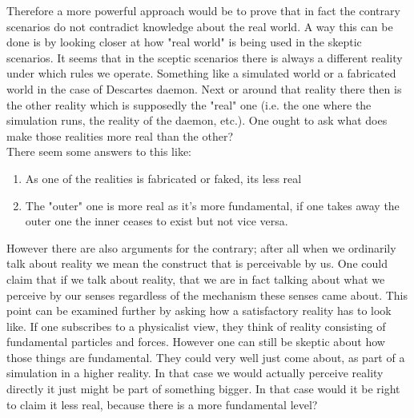 \documentclass[14pt]{article}
\begin{document}
Therefore a more powerful approach would be to prove that in fact the contrary scenarios do not contradict knowledge about the real world.
A way this can be done is by looking closer at how "real world" is being used in the skeptic scenarios. It seems that in the sceptic scenarios
there is always a different reality under which rules we operate. Something like a simulated world or a fabricated world in the case of Descartes
daemon. Next or around that reality there then is the other reality which is supposedly the "real" one (i.e. the one where the simulation runs, the
reality of the daemon, etc.). One ought to ask what does make those realities more real than the other? \\

There seem some answers to this like:
\begin{enumerate}
  \item As one of the realities is fabricated or faked, its less real
  \item The "outer" one is more real as it's more fundamental, if one takes away the outer one the inner ceases to exist but not vice versa. 
\end{enumerate}

However there are also arguments for the contrary; after all when we ordinarily talk about reality we mean the construct that is perceivable by us.
One could claim that  if we talk about reality, that we are in fact talking about what we perceive by our senses regardless
of the mechanism these senses came about. This point can be examined further by asking how a satisfactory reality has to look like. If one subscribes
to a physicalist view, they think of reality consisting of fundamental particles and forces. However one can still be skeptic about how those things
are fundamental. They could very well just come about, as part of a simulation in a higher reality. In that case we would actually perceive reality
directly it just might be part of something bigger. In that case would it be right to claim it less real, because there is a more fundamental level?\\
\end{document}
